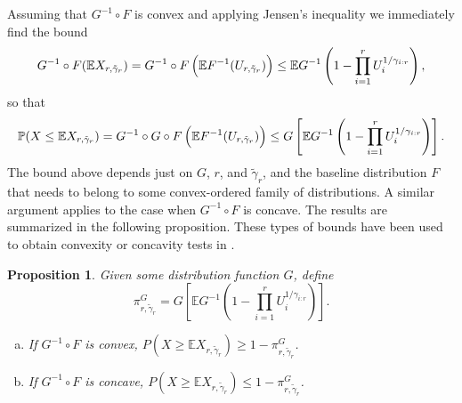 \documentclass [11pt]{article}
\newtheorem{proposition}{Proposition}
\begin{document}
Assuming that $G^{-1}\circ F$ is convex and applying Jensen's inequality we immediately find the bound
$$
G^{-1}\circ F(\mathbb E X_{r,\tilde{\gamma}_r})
= G^{-1} \circ F \,\Bigl(\mathbb{E} F^{-1} (U_{r, \tilde{\gamma}_r})\Bigr)
\leq \mathbb E G^{-1}\left(1-\prod_{i=1}^{r}U_i^{1/\gamma_{i:r}}\right),
$$
so that
$$
\mathbb{P}(X\leq \mathbb E X_{r,\tilde{\gamma}_r})
= G^{-1} \circ G \circ F \,\Bigl(\mathbb{E} F^{-1} (U_{r, \tilde{\gamma}_r})\Bigr)
\leq G\left[\mathbb E G^{-1}\left(1-\prod_{i=1}^{r}U_i^{1/\gamma_{i:r}}\right)\right].
$$
The bound above depends just on $G$, $r$, and $\tilde{\gamma}_r$,  and the baseline distribution $F$ that needs to belong to some convex-ordered family of distributions.
A similar argument applies to the case when $G^{-1}\circ F$ is concave.  The results are summarized in the following proposition.
These types of bounds have been used to obtain convexity or concavity tests in \cite{LandoMohammed2025}.
\begin{proposition}
Given some distribution function $G$, define
$$
\pi_{r,\tilde{\gamma}_r}^G=G\left[\mathbb E G^{-1}\left(1-\prod_{i=1}^{r}U_i^{1/\gamma_{i:r}}\right)\right].
$$
    \begin{enumerate}[(a)]
    \item If $G^{-1}\circ F$ is convex, $P(X\geq \mathbb E X_{r,\tilde{\gamma}_r})\geq 1-\pi_{r,\tilde{\gamma}_r}^G$.
    \item If $G^{-1}\circ F$ is concave, $P(X\geq \mathbb E X_{r,\tilde{\gamma}_r})\leq 1-\pi_{r,\tilde{\gamma}_r}^G$.
    \end{enumerate}
\end{proposition}
\end{document}
